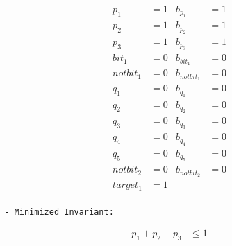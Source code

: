 \begin{align*}
     p_1      & = 1 &    b_{p_1}     & = 1 \\
     p_2      & = 1 &    b_{p_2}     & = 1 \\
     p_3      & = 1 &    b_{p_3}     & = 1 \\
     bit_1    & = 0 &    b_{bit_1}   & = 0 \\
notbit_1    & = 0 &    b_{notbit_1}  & = 0 \\
     q_1      & = 0 &    b_{q_1}     & = 0 \\
     q_2      & = 0 &    b_{q_2}     & = 0 \\
     q_3      & = 0 &    b_{q_3}     & = 0 \\
     q_4      & = 0 &    b_{q_4}     & = 0 \\
     q_5      & = 0 &    b_{q_5}     & = 0 \\
notbit_2    & = 0 &    b_{notbit_2}  & = 0 \\
     target_1 & = 1 \\
\end{align*}
    
\begin{verbatim}
  - Minimized Invariant:
\end{verbatim}

\begin{align*}
    p_1 + p_2 + p_3 & \le 1
\end{align*}
\fi

\fi


